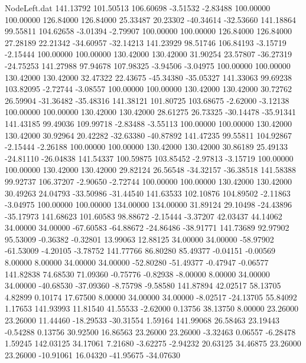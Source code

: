 \begin{filecontents}{NodeLeft.dat}
 141.13792  101.50513  106.60698    -3.51532   -2.83488  100.00000  100.00000  126.84000  126.84000   25.33487   20.23302  -40.34614  -32.53660
 141.18864   99.55811  104.62658    -3.01394   -2.79907  100.00000  100.00000  126.84000  126.84000   27.28189   22.21342  -34.60957  -32.14213
 141.23929   98.51746  106.84193    -3.15719   -2.15444  100.00000  100.00000  130.42000  130.42000   31.90254   23.57807  -36.27319  -24.75253
 141.27988   97.94678  107.98325    -3.94506   -3.04975  100.00000  100.00000  130.42000  130.42000   32.47322   22.43675  -45.34380  -35.05327
 141.33063   99.69238  103.82095    -2.72744   -3.08557  100.00000  100.00000  130.42000  130.42000   30.72762   26.59904  -31.36482  -35.48316
 141.38121  101.80725  103.68675    -2.62000   -3.12138  100.00000  100.00000  130.42000  130.42000   28.61275   26.73325  -30.14478  -35.91341
 141.43185   99.49036  109.99718    -2.83488   -3.55113  100.00000  100.00000  130.42000  130.42000   30.92964   20.42282  -32.63380  -40.87892
 141.47235   99.55811  104.92867    -2.15444   -2.26188  100.00000  100.00000  130.42000  130.42000   30.86189   25.49133  -24.81110  -26.04838
 141.54337  100.59875  103.85452    -2.97813   -3.15719  100.00000  100.00000  130.42000  130.42000   29.82124   26.56548  -34.32157  -36.38518
 141.58388   99.92737  106.37207    -2.90650   -2.72744  100.00000  100.00000  130.42000  130.42000   30.49263   24.04793  -33.50986  -31.44540
 141.63533  102.10876  104.89502    -2.11863   -3.04975  100.00000  100.00000  134.00000  134.00000   31.89124   29.10498  -24.43896  -35.17973
 141.68623  101.60583   98.88672    -2.15444   -3.37207   42.03437   44.14062   34.00000   34.00000  -67.60583  -64.88672  -24.86486  -38.91771
 141.73689   92.97902   95.53009    -0.36382   -0.32801   13.99063   12.88125   34.00000   34.00000  -58.97902  -61.53009   -4.20105   -3.78752
 141.77766   86.80280   85.49377    -0.04151   -0.00569    8.00000    8.00000   34.00000   34.00000  -52.80280  -51.49377   -0.47947   -0.06577
 141.82838   74.68530   71.09360    -0.75776   -0.82938   -8.00000    8.00000   34.00000   34.00000  -40.68530  -37.09360   -8.75798   -9.58580
 141.87894   42.02517   58.13705     4.82899    0.10174   17.67500    8.00000   34.00000   34.00000   -8.02517  -24.13705   55.84092    1.17653
 141.93993   11.81540   41.55533    -2.62000    0.13756   38.13750    8.00000   23.26000   23.26000   11.44460  -18.29533  -30.31554    1.59164
 141.99068   26.58463   23.19443    -0.54288    0.13756   30.92500   16.86563   23.26000   23.26000   -3.32463    0.06557   -6.28478    1.59245
 142.03125   34.17061    7.21680    -3.62275   -2.94232   20.63125   34.46875   23.26000   23.26000  -10.91061   16.04320  -41.95675  -34.07630

\end{filecontents}
